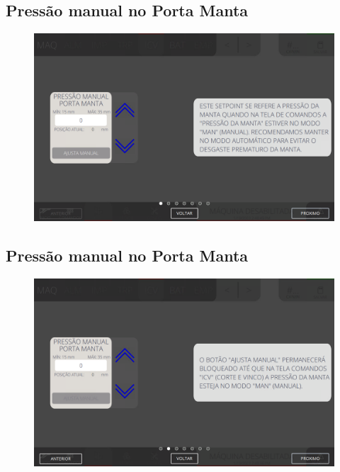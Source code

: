 
\thispagestyle{fancy}
\vspace{\fill}
\subsection{Pressão manual no Porta Manta}
\begin{figure}
    \centering
    \includegraphics[width=480 px,height=300 px]{src/imagesICV/06-dryCutter/settings/e-1.png}
\end{figure}

\newpage
\thispagestyle{fancy}
\vspace{\fill}
\subsection{Pressão manual no Porta Manta}
\begin{figure}
    \centering
    \includegraphics[width=576 px,height=360 px]{src/imagesICV/06-dryCutter/settings/e-2.png}
\end{figure}

